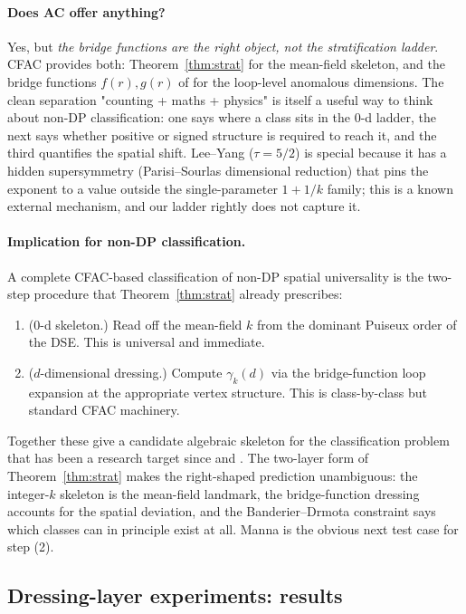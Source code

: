 \documentclass[11pt,a4paper]{article}
\theoremstyle{plain}
\theoremstyle{definition}
\begin{document}
\paragraph{Does AC offer anything?}
Yes, but \emph{the bridge functions are the right object, not
the stratification ladder}.  CFAC provides both:
Theorem~\ref{thm:strat} for the mean-field skeleton, and the
bridge functions $f(r), g(r)$ of \citet{CFACpaper} for the
loop-level anomalous dimensions.  The clean separation
"counting + maths + physics" is itself a useful way to think
about non-DP classification: one says where a class sits in the
0-d ladder, the next says whether positive or signed structure
is required to reach it, and the third quantifies the spatial
shift.  Lee--Yang ($\tau = 5/2$) is special because it has a
hidden supersymmetry (Parisi--Sourlas dimensional reduction)
that pins the exponent to a value outside the
single-parameter $1+1/k$ family; this is a known external
mechanism, and our ladder rightly does not capture it.

\paragraph{Implication for non-DP classification.}
A complete CFAC-based classification of non-DP spatial
universality is the two-step procedure that Theorem~\ref{thm:strat}
already prescribes:
\begin{enumerate}[label=(\arabic*)]
  \item ($0$-d skeleton.)  Read off the mean-field $k$ from the
    dominant Puiseux order of the DSE.  This is universal and
    immediate.
  \item ($d$-dimensional dressing.)  Compute $\gamma_{k}(d)$ via
    the bridge-function loop expansion at the appropriate vertex
    structure.  This is class-by-class but standard CFAC
    machinery.
\end{enumerate}
Together these give a candidate algebraic skeleton for the
classification problem that has been a research target since
\citet{Hinrichsen2000} and \citet{Odor2004}.  The two-layer
form of Theorem~\ref{thm:strat} makes the right-shaped
prediction unambiguous: the integer-$k$ skeleton is the
mean-field landmark, the bridge-function dressing accounts for
the spatial deviation, and the Banderier--Drmota constraint says
which classes can in principle exist at all.  Manna is the
obvious next test case for step (2).

\subsection{Dressing-layer experiments: results}
\label{app:exp4plus}
\end{document}
